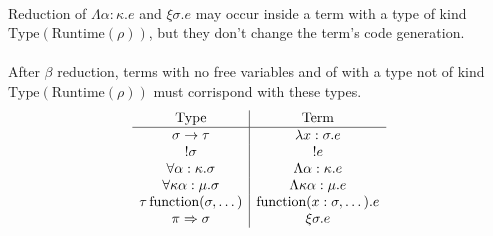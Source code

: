 \documentclass {article}
\begin{document}
\\
Reduction of $ \Lambda \alpha : \kappa. e $ and $ \xi \sigma. e $ may occur inside a term with a type of kind $ \text{Type} (\text{Runtime} (\rho)) $, but they don't
change the term's code generation. \\
\\
After $ \beta $ reduction, terms with no free variables and of with a type not of kind $ \text{Type} (\text{Runtime} (\rho) ) $ must corrispond with these types. \\
\begin{gather*}
\begin{array}{c | c}
\text{Type} & \text{Term} \\
\hline
\sigma \to \tau & \lambda x : \sigma. e \\
!\sigma & !e \\
\forall \alpha : \kappa. \sigma & \Lambda \alpha : \kappa. e  \\
\forall \kappa \alpha : \mu. \sigma & \Lambda \kappa \alpha : \mu. e \\
\tau \, \text{function} (\sigma, \dots) & \text{function}(x : \sigma, \dots). e \\
\pi \Rightarrow \sigma & \xi \sigma. e
\end{array}
\end{gather*}
\end{document}
